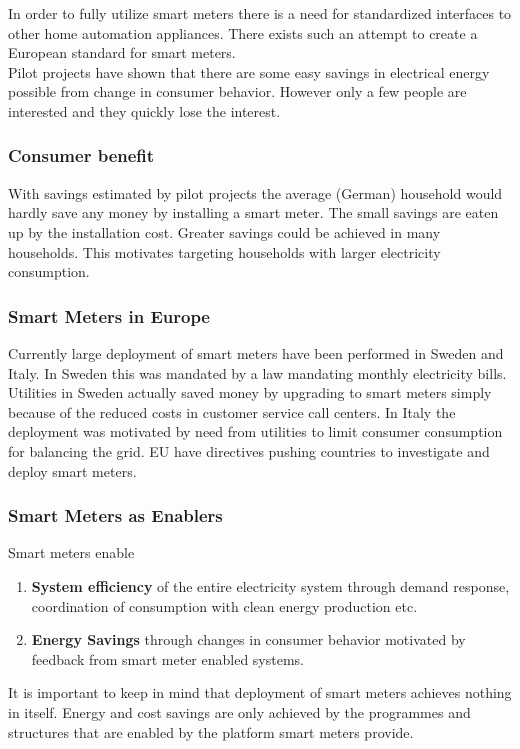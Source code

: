 In order to fully utilize smart meters there is a need for standardized interfaces to other home automation appliances.
There exists such an attempt to create a European standard for smart meters.\\

Pilot projects have shown that there are some easy savings in electrical energy possible from change in consumer behavior.
However only a few people are interested and they quickly lose the interest.

\subsubsection{Consumer benefit}
With savings estimated by pilot projects the average (German) household would hardly save any money by installing a smart meter. The small savings are eaten up by the installation cost.
Greater savings could be achieved in many households.
This motivates targeting households with larger electricity consumption.

\subsubsection{Smart Meters in Europe}
Currently large deployment of smart meters have been performed in Sweden and Italy.
In Sweden this was mandated by a law mandating monthly electricity bills.
Utilities in Sweden actually saved money by upgrading to smart meters simply because of the reduced costs in customer service call centers.
In Italy the deployment was motivated by need from utilities to limit consumer consumption for balancing the grid.
EU have directives pushing countries to investigate and deploy smart meters.

\subsubsection{Smart Meters as Enablers}
Smart meters enable
\begin{enumerate}
    \item \textbf{System efficiency} of the entire electricity system through demand response, coordination of consumption with clean energy production etc.
    \item \textbf{Energy Savings} through changes in consumer behavior motivated by feedback from smart meter enabled systems.
\end{enumerate}

It is important to keep in mind that deployment of smart meters achieves nothing in itself.
Energy and cost savings are only achieved by the programmes and structures that are enabled by the platform smart meters provide.


